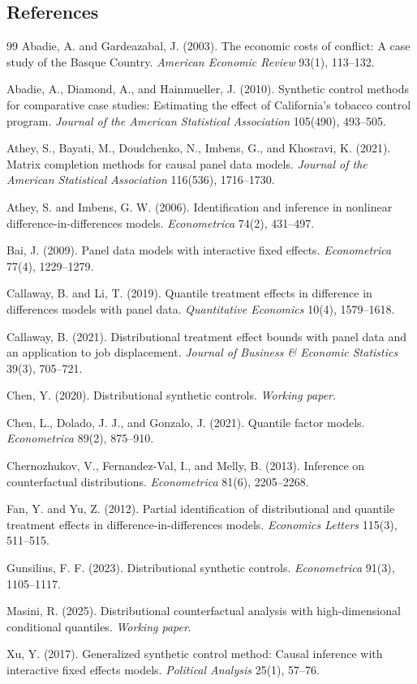 \documentclass[11pt]{article}
\theoremstyle{definition}
\theoremstyle{plain}
\theoremstyle{remark}
\begin{document}
\subsection*{References}
\begin{thebibliography}{99}
Abadie, A. and Gardeazabal, J. (2003).
The economic costs of conflict: A case study of the Basque Country.
\emph{American Economic Review} 93(1), 113--132.

Abadie, A., Diamond, A., and Hainmueller, J. (2010).
Synthetic control methods for comparative case studies: Estimating the effect of California's tobacco control program.
\emph{Journal of the American Statistical Association} 105(490), 493--505.

Athey, S., Bayati, M., Doudchenko, N., Imbens, G., and Khosravi, K. (2021).
Matrix completion methods for causal panel data models.
\emph{Journal of the American Statistical Association} 116(536), 1716--1730.

Athey, S. and Imbens, G. W. (2006).
Identification and inference in nonlinear difference-in-differences models.
\emph{Econometrica} 74(2), 431--497.

Bai, J. (2009).
Panel data models with interactive fixed effects.
\emph{Econometrica} 77(4), 1229--1279.

Callaway, B. and Li, T. (2019).
Quantile treatment effects in difference in differences models with panel data.
\emph{Quantitative Economics} 10(4), 1579--1618.

Callaway, B. (2021).
Distributional treatment effect bounds with panel data and an application to job displacement.
\emph{Journal of Business \& Economic Statistics} 39(3), 705--721.

Chen, Y. (2020).
Distributional synthetic controls.
\emph{Working paper}.

Chen, L., Dolado, J. J., and Gonzalo, J. (2021).
Quantile factor models.
\emph{Econometrica} 89(2), 875--910.

Chernozhukov, V., Fernandez-Val, I., and Melly, B. (2013).
Inference on counterfactual distributions.
\emph{Econometrica} 81(6), 2205--2268.

Fan, Y. and Yu, Z. (2012).
Partial identification of distributional and quantile treatment effects in difference-in-differences models.
\emph{Economics Letters} 115(3), 511--515.

Gunsilius, F. F. (2023).
Distributional synthetic controls.
\emph{Econometrica} 91(3), 1105--1117.

Masini, R. (2025).
Distributional counterfactual analysis with high-dimensional conditional quantiles.
\emph{Working paper}.

Xu, Y. (2017).
Generalized synthetic control method: Causal inference with interactive fixed effects models.
\emph{Political Analysis} 25(1), 57--76.
\end{thebibliography}
\end{document}
